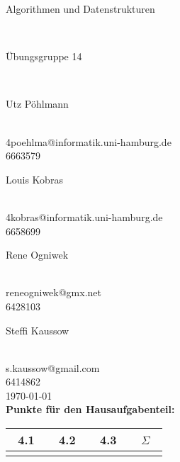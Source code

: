 \documentclass{article}
\begin{document}
\thispagestyle{empty}
\-\vspace{2cm}
\begin{center}
	\begin{Huge}
		Algorithmen und Datenstrukturen
	\end{Huge}\\
	\vspace{2cm}
	\begin{LARGE}
		Übungsgruppe 14
	\end{LARGE}\\
	\vspace{2cm}
	\begin{Large}
		Utz Pöhlmann
	\end{Large}\\
	4poehlma@informatik.uni-hamburg.de\\
	6663579\\
	\vspace{1cm}
	\begin{Large}
		Louis Kobras
	\end{Large}\\
	4kobras@informatik.uni-hamburg.de\\
	6658699\\
	\vspace{1cm}
	\begin{Large}
		Rene Ogniwek
	\end{Large}\\
	reneogniwek@gmx.net\\
	6428103\\
	\vspace{1cm}
	\begin{Large}
		Steffi Kaussow
	\end{Large}\\
	s.kaussow@gmail.com\\
	6414862\\
	\vspace{2cm}
	\today\\
	\vspace{2cm}
	\textbf{Punkte für den Hausaufgabenteil:}\\
	\vspace{1cm}
	\begin{tabular}{c|c|c|c}
	~4.1~&~4.2~&~4.3~&~$\Sigma$~	\\	\hline
		 &	   &	 &
	\end{tabular}
\end{center}
\newpage
\thispagestyle{empty}
\tableofcontents
\newpage
\end{document}
